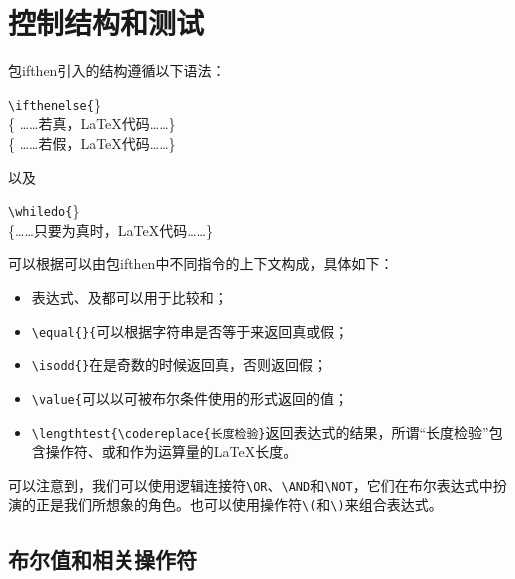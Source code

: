 \section{控制结构和测试}

包\textsf{ifthen}引入的结构遵循以下语法：

\begin{dmd}
\verb+\ifthenelse{+\}\\
\{ ……若真，\LaTeX 代码……\}\\
\{ ……若假，\LaTeX 代码……\}
\end{dmd}

以及

\begin{dmd}
\verb+\whiledo{+\}\\
\{……只要为真时，\LaTeX 代码……\}
\end{dmd}

可以根据可以由包\textsf{ifthen}中不同指令的上下文构成，具体如下：

\begin{itemize}
    \item 表达式\dm{>}、\dm{<}及\dm{=}都可以用于比较和；
    \item \verb+\equal{+\verb+}{+\dm{\}}可以根据字符串是否等于来返回真或假；
    \item \verb+\isodd{+\verb+}+在是奇数的时候返回真，否则返回假；
    \item \verb+\value{+\dm{\}}可以以可被布尔条件使用的形式返回的值；
    \item \verb+\lengthtest{\codereplace{长度检验}+\dm{\}}返回表达式的结果，所谓“长度检验”包含操作符\dm{>}、\dm{<}或\dm{=}和作为运算量的\LaTeX 长度。
\end{itemize}

可以注意到，我们可以使用逻辑连接符\verb+\OR+、\verb+\AND+和\verb+\NOT+，它们在布尔表达式中扮演的正是我们所想象的角色。也可以使用操作符\verb+\(+和\verb+\)+来组合表达式。

\subsection{布尔值和相关操作符}

